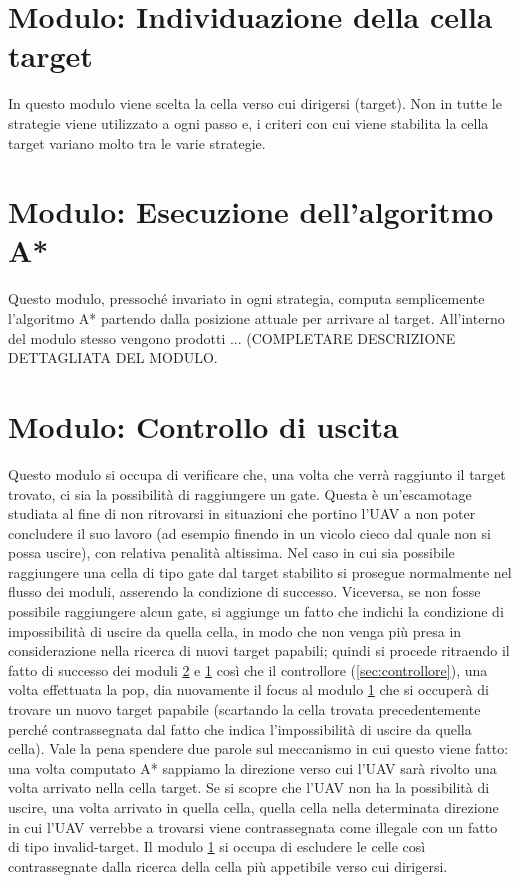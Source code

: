 \section{Modulo: Individuazione della cella target} \label{sec:target}
In questo modulo viene scelta la cella verso cui dirigersi (target). {\color{red} Non in tutte le strategie viene utilizzato a ogni passo} e, i criteri con cui viene stabilita la cella target variano molto tra le varie strategie.

\section{Modulo: Esecuzione dell'algoritmo A*} \label{sec:astar}
Questo modulo, {\color{red}pressoché invariato in ogni strategia}, computa semplicemente l'algoritmo A* partendo dalla posizione attuale per arrivare al target. All'interno del modulo stesso vengono prodotti {\color{red} ... (COMPLETARE DESCRIZIONE DETTAGLIATA DEL MODULO}.

\section{Modulo: Controllo di uscita} \label{sec:uscita}
Questo modulo si occupa di verificare che, una volta che verrà raggiunto il target trovato, ci sia la possibilità di raggiungere un gate. Questa è un'escamotage studiata al fine di non ritrovarsi in situazioni che portino l'UAV a non poter concludere il suo lavoro (ad esempio finendo in un vicolo cieco dal quale non si possa uscire), con relativa penalità altissima.
Nel caso in cui sia possibile raggiungere una cella di tipo gate dal target stabilito si prosegue normalmente nel flusso dei moduli, asserendo la condizione di successo. Viceversa, se non fosse possibile raggiungere alcun gate, si aggiunge un fatto che indichi la condizione di impossibilità di uscire da quella cella, in modo che non venga più presa in considerazione nella ricerca di nuovi target papabili; quindi si procede ritraendo il fatto di successo dei moduli \ref{sec:astar} e \ref{sec:target} così che il controllore (\ref{sec:controllore}), una volta effettuata la pop, dia nuovamente il focus al modulo \ref{sec:target} che si occuperà di trovare un nuovo target papabile (scartando la cella trovata precedentemente perché contrassegnata dal fatto che indica l'impossibilità di uscire da quella cella). Vale la pena spendere due parole sul meccanismo in cui questo viene fatto: una volta computato A* sappiamo la direzione verso cui l'UAV sarà rivolto una volta arrivato nella cella target. Se si scopre che l'UAV non ha la possibilità di uscire, una volta arrivato in quella cella, quella cella nella determinata direzione in cui l'UAV verrebbe a trovarsi viene contrassegnata come illegale con un fatto di tipo invalid-target. Il modulo \ref{sec:target} si occupa di escludere le celle così contrassegnate dalla ricerca della cella più appetibile verso cui dirigersi.


